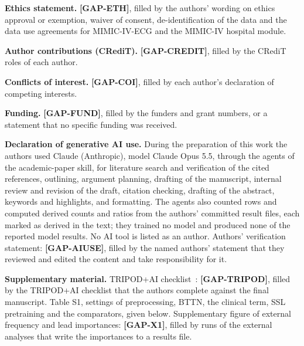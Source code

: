\documentclass[preprint,12pt]{elsarticle}
\begin{document}
\textbf{Ethics statement.} \textbf{[GAP-ETH]}, filled by the authors' wording on ethics approval or exemption, waiver of consent, de-identification of the data and the data use agreements for MIMIC-IV-ECG and the MIMIC-IV hospital module.

\textbf{Author contributions (CRediT).} \textbf{[GAP-CREDIT]}, filled by the CRediT roles of each author.

\textbf{Conflicts of interest.} \textbf{[GAP-COI]}, filled by each author's declaration of competing interests.

\textbf{Funding.} \textbf{[GAP-FUND]}, filled by the funders and grant numbers, or a statement that no specific funding was received.

\textbf{Declaration of generative AI use.} During the preparation of this work the authors used Claude (Anthropic), model Claude Opus 5.5, through the agents of the academic-paper skill, for literature search and verification of the cited references, outlining, argument planning, drafting of the manuscript, internal review and revision of the draft, citation checking, drafting of the abstract, keywords and highlights, and formatting. The agents also counted rows and computed derived counts and ratios from the authors' committed result files, each marked as derived in the text; they trained no model and produced none of the reported model results. No AI tool is listed as an author. Authors' verification statement: \textbf{[GAP-AIUSE]}, filled by the named authors' statement that they reviewed and edited the content and take responsibility for it.

\textbf{Supplementary material.} TRIPOD+AI checklist~\cite{collins2024}: \textbf{[GAP-TRIPOD]}, filled by the TRIPOD+AI checklist that the authors complete against the final manuscript. Table S1, settings of preprocessing, BTTN, the clinical term, SSL pretraining and the comparators, given below. Supplementary figure of external frequency and lead importances: \textbf{[GAP-X1]}, filled by runs of the external analyses that write the importances to a results file.
\end{document}
